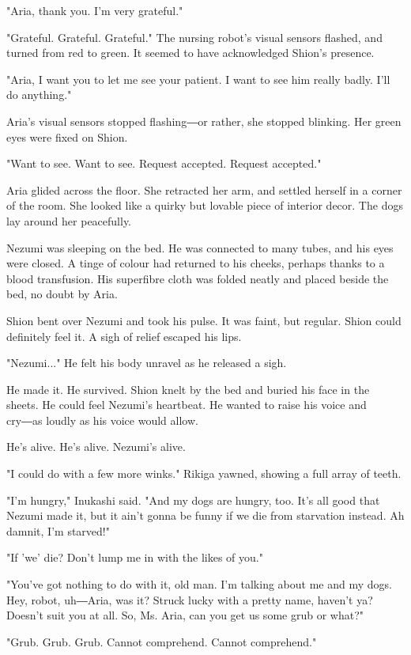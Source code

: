 "Aria, thank you. I'm very grateful."

"Grateful. Grateful. Grateful." The nursing robot's visual sensors
flashed, and turned from red to green. It seemed to have acknowledged
Shion's presence.

"Aria, I want you to let me see your patient. I want to see him really
badly. I'll do anything."

Aria's visual sensors stopped flashing―or rather, she stopped blinking.
Her green eyes were fixed on Shion.

"Want to see. Want to see. Request accepted. Request accepted."

Aria glided across the floor. She retracted her arm, and settled herself
in a corner of the room. She looked like a quirky but lovable piece of
interior decor. The dogs lay around her peacefully.

Nezumi was sleeping on the bed. He was connected to many tubes, and his
eyes were closed. A tinge of colour had returned to his cheeks, perhaps
thanks to a blood transfusion. His superfibre cloth was folded neatly
and placed beside the bed, no doubt by Aria.

Shion bent over Nezumi and took his pulse. It was faint, but regular.
Shion could definitely feel it. A sigh of relief escaped his lips.

"Nezumi..." He felt his body unravel as he released a sigh.

He made it. He survived. Shion knelt by the bed and buried his face in
the sheets. He could feel Nezumi's heartbeat. He wanted to raise his
voice and cry―as loudly as his voice would allow.

He's alive. He's alive. Nezumi's alive.

"I could do with a few more winks." Rikiga yawned, showing a full array
of teeth.

"I'm hungry," Inukashi said. "And my dogs are hungry, too. It's all good
that Nezumi made it, but it ain't gonna be funny if we die from
starvation instead. Ah damnit, I'm starved!"

"If 'we' die? Don't lump me in with the likes of you."

"You've got nothing to do with it, old man. I'm talking about me and my
dogs. Hey, robot, uh―Aria, was it? Struck lucky with a pretty name,
haven't ya? Doesn't suit you at all. So, Ms. Aria, can you get us some
grub or what?"

"Grub. Grub. Grub. Cannot comprehend. Cannot comprehend."

